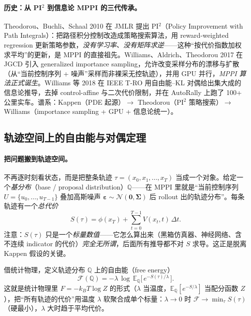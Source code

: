 \paragraph{历史：从 PI$^2$ 到信息论 MPPI 的三代传承。}
Theodorou、Buchli、Schaal 2010 在 JMLR 提出 PI$^2$（Policy Improvement with Path Integrals）：把路径积分控制改造成策略搜索算法，用 reward-weighted regression 更新策略参数，\emph{没有学习率、没有矩阵求逆}——这种“按代价指数加权求平均”的更新，是 MPPI 的直接祖先\cite{theodorou2010generalized}。Williams、Aldrich、Theodorou 2017 在 JGCD 引入 generalized importance sampling，允许改变采样分布的漂移与扩散（从“当前控制序列 + 噪声”采样而非裸采无控轨迹），并用 GPU 并行，\emph{MPPI 算法正式诞生}\cite{williams2017model}。Williams 等 2018 在 IEEE T-RO 用自由能--KL 对偶给出集大成的信息论推导，去掉 control-affine 与二次代价限制，并在 AutoRally 上跑了 100+ 公里实车\cite{williams2018information}。谱系：Kappen（PDE 起源）$\to$ Theodorou（PI$^2$ 策略搜索）$\to$ Williams（importance sampling + GPU + 信息论统一）。

\subsection{轨迹空间上的自由能与对偶定理}
\label{sec:mppi-duality}

\paragraph{把问题搬到轨迹空间。}不再逐时刻看状态，而是把整条轨迹 $\tau=(x_0,x_1,\dots,x_T)$ 当成一个对象。给定一个\emph{基分布}（base / proposal distribution）$\mathbb{Q}$——在 MPPI 里就是“当前控制序列 $U=\{u_0,\dots,u_{T-1}\}$ 叠加高斯噪声 $\boldsymbol{\varepsilon}\sim\mathcal{N}(\mathbf{0},\boldsymbol{\Sigma})$ 后 rollout 出的轨迹分布”。每条轨迹有一个\emph{总代价}
\begin{equation}
  S(\tau)=\phi(x_T)+\sum_{t=0}^{T-1}V(x_t,t)\,\Delta t.
  \label{eq:mppi-S}
\end{equation}
注意：$S(\tau)$ 只是一个\emph{标量数值}——它怎么算出来（黑箱仿真器、神经网络、含不连续 indicator 的代价）\emph{完全无所谓}，后面所有推导都不对 $S$ 求导。这正是脱离 Kappen 假设的关键。

\begin{definition}[轨迹分布上的自由能]\label{def:mppi-freeenergy}
借统计物理，定义轨迹分布 $\mathbb{Q}$ 上的自由能（free energy）
\begin{equation}
  \mathcal{F}(\mathbb{Q})=-\lambda\,\log\,\mathbb{E}_{\mathbb{Q}}\!\big[\,e^{-S(\tau)/\lambda}\,\big].
  \label{eq:mppi-F}
\end{equation}
这就是统计物理里 $F=-k_B T\log Z$ 的形式（$\lambda$ 当温度，$\mathbb{E}_{\mathbb{Q}}[e^{-S/\lambda}]$ 当配分函数 $Z$），把“所有轨迹的代价”用温度 $\lambda$ 软聚合成单个标量：$\lambda\to0$ 时 $\mathcal{F}\to\min_\tau S(\tau)$（硬最小），$\lambda$ 大时趋于平均代价。
\end{definition}

